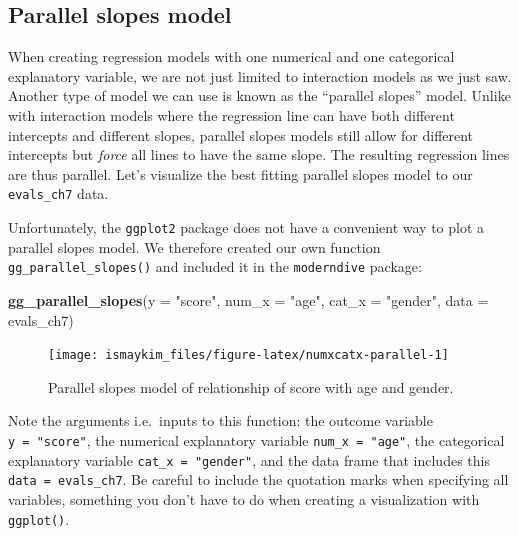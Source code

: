 \documentclass[12pt, krantz2,]{krantz}
\makeatletter
\newenvironment{Shaded}{\begin{snugshade}}{\end{snugshade}}
\newcommand{\DataTypeTok}[1]{\textcolor[rgb]{0.27,0.27,0.27}{#1}}
\newcommand{\KeywordTok}[1]{\textcolor[rgb]{0.27,0.27,0.27}{\textbf{#1}}}
\newcommand{\NormalTok}[1]{#1}
\newcommand{\StringTok}[1]{\textcolor[rgb]{0.5,0.5,0.5}{#1}}
\newenvironment{kframe}{%
\medskip{}
\setlength{\fboxsep}{.8em}
 \def\at@end@of@kframe{}%
 \ifinner\ifhmode%
  \def\at@end@of@kframe{\end{minipage}}%
  \begin{minipage}{\columnwidth}%
 \fi\fi%
 \def\FrameCommand##1{\hskip\@totalleftmargin \hskip-\fboxsep
 \colorbox{shadecolor}{##1}\hskip-\fboxsep
     \hskip-\linewidth \hskip-\@totalleftmargin \hskip\columnwidth}%
 \MakeFramed {\advance\hsize-\width
   \@totalleftmargin\z@ \linewidth\hsize
   \@setminipage}}%
 {\par\unskip\endMakeFramed%
 \at@end@of@kframe}
\renewenvironment{Shaded}{\begin{kframe}}{\end{kframe}}
\makeatother
\begin{document}
\hypertarget{model4table}{%
\subsection{Parallel slopes model}\label{model4table}}

When creating regression models with one numerical and one categorical explanatory variable, we are not just limited to interaction models as we just saw. Another type of model we can use is known as the ``parallel slopes'' model. Unlike with interaction models where the regression line can have both different intercepts and different slopes, parallel slopes models still allow for different intercepts but \emph{force} all lines to have the same slope. The resulting regression lines are thus parallel. Let's visualize the best fitting parallel slopes model to our \texttt{evals\_ch7} data.

Unfortunately, the \texttt{ggplot2} package does not have a convenient way to plot a parallel slopes model. We therefore created our own function \texttt{gg\_parallel\_slopes()} and included it in the \texttt{moderndive} package:

\begin{Shaded}
\begin{Highlighting}[]
\KeywordTok{gg_parallel_slopes}\NormalTok{(}\DataTypeTok{y =} \StringTok{"score"}\NormalTok{, }\DataTypeTok{num_x =} \StringTok{"age"}\NormalTok{, }\DataTypeTok{cat_x =} \StringTok{"gender"}\NormalTok{, }
                   \DataTypeTok{data =}\NormalTok{ evals_ch7)}
\end{Highlighting}
\end{Shaded}

\begin{figure}

{\centering \texttt{[image: ismaykim\_files/figure-latex/numxcatx-parallel-1]} 

}

\caption{Parallel slopes model of relationship of score with age and gender.}\label{fig:numxcatx-parallel}
\end{figure}

Note the arguments i.e.~inputs to this function: the outcome variable \texttt{y\ =\ "score"}, the numerical explanatory variable \texttt{num\_x\ =\ "age"}, the categorical explanatory variable \texttt{cat\_x\ =\ "gender"}, and the data frame that includes this \texttt{data\ =\ evals\_ch7}. Be careful to include the quotation marks when specifying all variables, something you don't have to do when creating a visualization with \texttt{ggplot()}.
\end{document}
